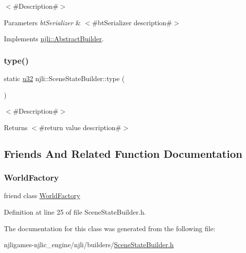 $<$\#\+Description\#$>$


\begin{DoxyParams}{Parameters}
{\em bt\+Serializer} & $<$\#bt\+Serializer description\#$>$ \\
\hline
\end{DoxyParams}


Implements \mbox{\hyperlink{classnjli_1_1_abstract_builder_ab66b774e02ccb9da554c9aab7fa6d981}{njli\+::\+Abstract\+Builder}}.

\mbox{\label{classnjli_1_1_scene_state_builder_aa964a5f9761378d3a65c4a826f1edde2}} 
\subsubsection{\texorpdfstring{type()}{type()}}
{\footnotesize\ttfamily static \mbox{\hyperlink{_util_8h_a10e94b422ef0c20dcdec20d31a1f5049}{u32}} njli\+::\+Scene\+State\+Builder\+::type (\begin{DoxyParamCaption}{ }\end{DoxyParamCaption})\hspace{0.3cm}{\ttfamily [static]}}

$<$\#\+Description\#$>$

\begin{DoxyReturn}{Returns}
$<$\#return value description\#$>$ 
\end{DoxyReturn}


\subsection{Friends And Related Function Documentation}
\mbox{\label{classnjli_1_1_scene_state_builder_acb96ebb09abe8f2a37a915a842babfac}} 
\subsubsection{\texorpdfstring{World\+Factory}{WorldFactory}}
{\footnotesize\ttfamily friend class \mbox{\hyperlink{classnjli_1_1_world_factory}{World\+Factory}}\hspace{0.3cm}{\ttfamily [friend]}}



Definition at line 25 of file Scene\+State\+Builder.\+h.



The documentation for this class was generated from the following file\+:\begin{DoxyCompactItemize}
\item 
njligames-\/njlic\+\_\+engine/njli/builders/\mbox{\hyperlink{_scene_state_builder_8h}{Scene\+State\+Builder.\+h}}\end{DoxyCompactItemize}
